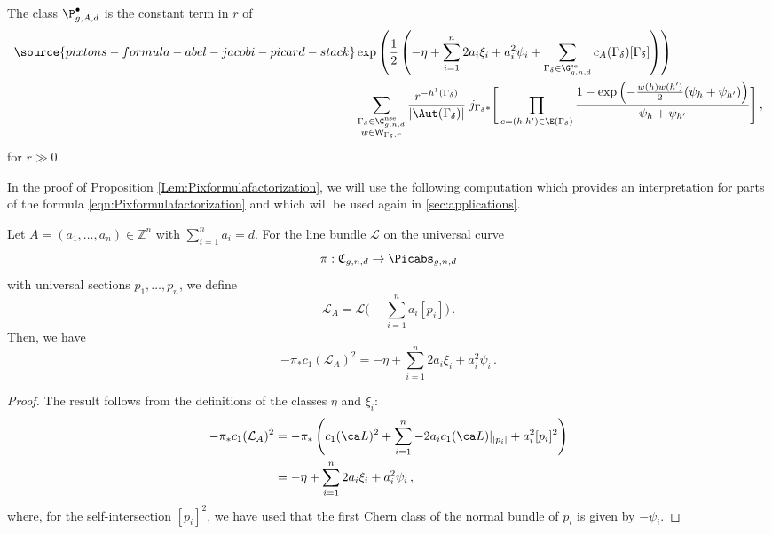 \begin{proposition}
\notready \label{Lem:Pixformulafactorization}
The class $\P_{g,A,d}^{\bullet}$ is the constant term in $r$ of
\begin{align} \label{eqn:Pixformulafactorization}
\source{pixtons-formula-abel-jacobi-picard-stack}
&\exp\left(\frac12 \left( -\eta + \sum_{i=1}^n 2 a_i \xi_i+ a_i^2 \psi_i  + \sum_{\Gamma_\delta \in \G_{g,n,d}^\textup{se}} c_A(\Gamma_\delta) [\Gamma_\delta] \right) \right) \\ &\sum_{
\substack{\Gamma_\delta\in \G_{g,n,d}^\textup{nse} \\
w\in \mathsf{W}_{\Gamma_\delta,r}}
}
\frac{r^{-h^1(\Gamma_\delta)}}{|\Aut(\Gamma_\delta)| }
\;
j_{\Gamma_\delta*}\Bigg[
\prod_{e=(h,h')\in \E(\Gamma_\delta)}
\frac{1-\exp\left(-\frac{w(h)w(h')}2(\psi_h+\psi_{h'})\right)}{\psi_h + \psi_{h'}} \Bigg]\, , \nonumber
\end{align}
for $r \gg 0$.
\end{proposition}
In the proof of Proposition \ref{Lem:Pixformulafactorization}, we will use the following computation which provides an interpretation for parts of the formula \eqref{eqn:Pixformulafactorization} and which will be used again in \cref{sec:applications}.
\begin{lemma}
\notready \label{Lem:vertterm}
Let $A = (a_1,\ldots,a_n) \in \mathbb{Z}^n$
with $\sum_{i=1}^n a_i=d$.
 For the line bundle $\mathcal{L}$ on the universal curve $$\pi:\mathfrak{C}_{g,n,d} \to \Picabs_{g,n,d}$$
 with universal sections $p_1, \ldots, p_n$, we define $$\mathcal{L}_A = \mathcal{L}\Big(- \sum_{i=1}^n a_i [p_i]\Big)\, .$$ Then, we have
    \[- \pi_* c_1(\mathcal{L}_A)^2=
    -\eta + \sum_{i=1}^n 2 a_i \xi_i+ a_i^2 \psi_i\, .\]
\end{lemma}
\begin{proof} The result follows from the definitions of the classes $\eta$ and $\xi_i$:
\begin{align*}
- \pi_* c_1(\mathcal{L}_A)^2 &= - \pi_* \left(c_1(\ca L)^2 +  \sum_{i=1}^n - 2 a_i c_1(\ca L)|_{[p_i]} + a_i^2 [p_i]^2  \right) \\
&=-\eta + \sum_{i=1}^n 2 a_i \xi_i+ a_i^2 \psi_i\,,
\end{align*}
where, for the self-intersection $[p_i]^2$, we have used that the first Chern class of the normal bundle of $p_i$ is given by $- \psi_i$.
\end{proof}

